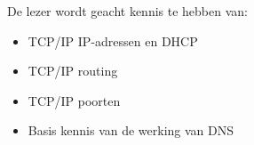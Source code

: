 De lezer wordt geacht kennis te hebben van:
\begin{itemize}
\item TCP/IP IP-adressen en DHCP
\item TCP/IP routing
\item TCP/IP poorten
\item Basis kennis van de werking van DNS
\end{itemize}

